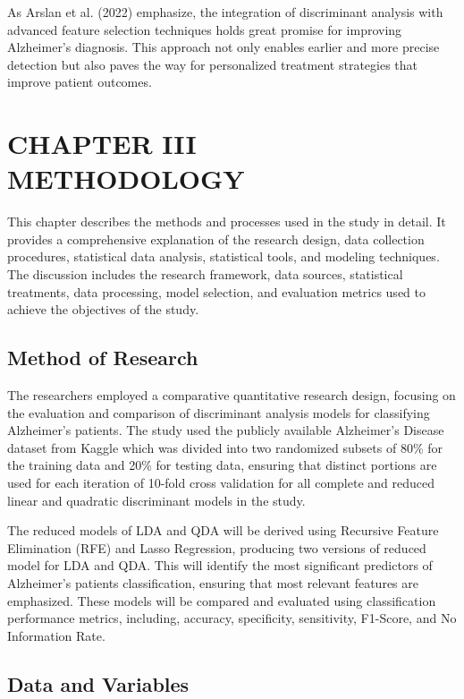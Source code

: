 \documentclass[12pt]{article}
\begin{document}
As Arslan et al. (2022) emphasize, the integration of discriminant analysis with advanced feature selection techniques holds great promise for improving Alzheimer’s diagnosis. This approach not only enables earlier and more precise detection but also paves the way for personalized treatment strategies that improve patient outcomes.


\newpage
\section{CHAPTER III \\ METHODOLOGY}

This chapter describes the methods and processes used in the study in detail. It provides a comprehensive explanation
of the research design, data collection procedures, statistical data analysis, statistical tools, and modeling techniques. 
The discussion includes the research framework, data sources, statistical treatments, data processing, model selection, and 
evaluation metrics used to achieve the objectives of the study. 

\subsection{Method of Research}
\noindent

The researchers employed a comparative quantitative research design, focusing on the evaluation and comparison of discriminant analysis models for classifying Alzheimer's patients. 
The study used the publicly available Alzheimer's Disease dataset from Kaggle which was divided into two randomized subsets of 80\% for the training data and 20\% for testing data, ensuring that distinct
portions are used for each iteration of 10-fold cross validation for all complete and reduced linear and quadratic discriminant models in the study. 

The reduced models of LDA and QDA will be derived using Recursive Feature Elimination (RFE) and Lasso Regression, producing two versions of reduced model for LDA and QDA. This will identify the most significant 
predictors of Alzheimer's patients classification, ensuring that most relevant features are emphasized. These models will be compared and evaluated using classification performance metrics, including, accuracy, specificity, 
sensitivity, F1-Score, and No Information Rate. 

\subsection{Data and Variables}
\noindent
\end{document}

